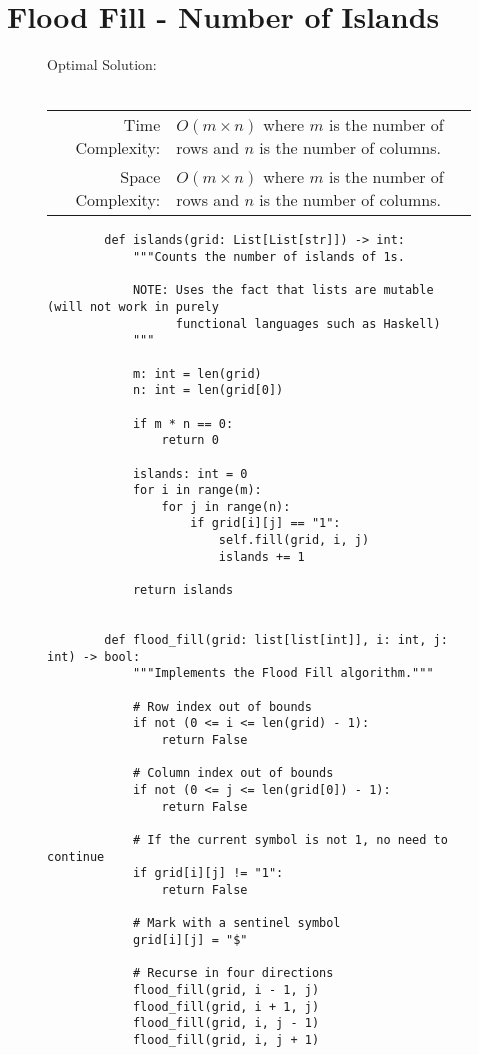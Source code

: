 
\section{Flood Fill - Number of Islands}

\begin{figure}[H]
    Optimal Solution:\\\\
    \begin{tabular}{rl}
        Time Complexity:& \(O(m \times n)\) where \(m\) is the number of rows
        and \(n\) is the number of columns.\\
        Space Complexity:& \(O(m \times n)\) where \(m\) is the number of rows
        and \(n\) is the number of columns.
    \end{tabular}
\end{figure}

\begin{figure}[H]
    \centering
    \begin{verbatim}
        def islands(grid: List[List[str]]) -> int:
            """Counts the number of islands of 1s.

            NOTE: Uses the fact that lists are mutable (will not work in purely
                  functional languages such as Haskell)
            """

            m: int = len(grid)
            n: int = len(grid[0])

            if m * n == 0:
                return 0

            islands: int = 0
            for i in range(m):
                for j in range(n):
                    if grid[i][j] == "1":
                        self.fill(grid, i, j)
                        islands += 1

            return islands


        def flood_fill(grid: list[list[int]], i: int, j: int) -> bool:
            """Implements the Flood Fill algorithm."""

            # Row index out of bounds
            if not (0 <= i <= len(grid) - 1):
                return False

            # Column index out of bounds
            if not (0 <= j <= len(grid[0]) - 1):
                return False

            # If the current symbol is not 1, no need to continue
            if grid[i][j] != "1":
                return False

            # Mark with a sentinel symbol
            grid[i][j] = "$"

            # Recurse in four directions
            flood_fill(grid, i - 1, j)
            flood_fill(grid, i + 1, j)
            flood_fill(grid, i, j - 1)
            flood_fill(grid, i, j + 1)
    \end{verbatim}
\end{figure}
